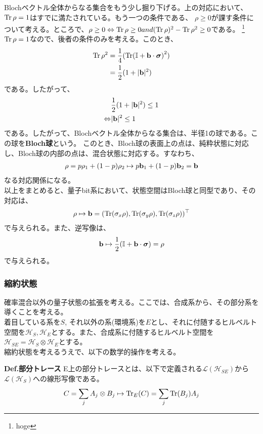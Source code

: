 \documentclass[a4paper,11pt]{jsarticle}
\numberwithin{equation}{section}
\begin{document}
Blochベクトル全体からなる集合をもう少し掘り下げる。上の対応において、$\Tr \rho =1$はすでに満たされている。もう一つの条件である、
$\rho \geq 0$が課す条件について考える。ところで、$\rho\geq 0 \Leftrightarrow \Tr \rho \geq 0 and (\Tr \rho)^2 - \Tr \rho^2 \geq 0$である。
\footnote{hoge}
$\Tr \rho =1$なので、後者の条件のみを考える。このとき、
\begin{align}
    \Tr \rho^2 &= \frac{1}{4}(\Tr(\mathbb{I} + \vb{b}\cdot\bm{\sigma})^2)\\
    &= \frac{1}{2}(1 + |\vb{b}|^2)
\end{align}
である。したがって、
\begin{align}
    &\frac{1}{2}(1 + |\vb{b}|^2) \leq 1\\
    \Leftrightarrow &|\vb{b}|^2 \leq 1
\end{align}
である。したがって、Blochベクトル全体からなる集合は、半径1の球である。この球を\textbf{Bloch球}という。
このとき、Bloch球の表面上の点は、純粋状態に対応し、Bloch球の内部の点は、混合状態に対応する。すなわち、
\begin{align}
    \rho = p\rho_1 + (1-p)\rho_2 \mapsto p\vb{b}_1 + (1-p)\vb{b}_2 = \vb{b}
\end{align}
なる対応関係になる。\\

以上をまとめると、量子bit系において、状態空間はBloch球と同型であり、その対応は、
\begin{align}
    \rho \mapsto \vb{b} = (\Tr(\sigma_x\rho), \Tr(\sigma_y\rho), \Tr(\sigma_z\rho))^{\top}
\end{align}
で与えられる。また、逆写像は、
\begin{align}
    \vb{b} \mapsto \frac{1}{2}(\mathbb{I} + \vb{b}\cdot\bm{\sigma}) = \rho
\end{align}
で与えられる。\\

\subsubsection{縮約状態}
確率混合以外の量子状態の拡張を考える。ここでは、合成系から、その部分系を導くことを考える。\\
着目している系を$S$, それ以外の系(環境系)を$E$とし、それに付随するヒルベルト空間を$\mathcal{H}_S, \mathcal{H}_E$とする。また、合成系に付随するヒルベルト空間を$\mathcal{H}_{SE} = \mathcal{H}_S \otimes \mathcal{H}_E$とする。\\
縮約状態を考えるうえで、以下の数学的操作を考える。
\begin{itembox}[l]{\textbf{Def.部分トレース}}
    E上の部分トレースとは、以下で定義される$\mathcal{L}(\mathcal{H}_{SE})$から$\mathcal{L}(\mathcal{H}_S)$への線形写像である。
    \begin{align}
        C = \sum_{j} A_j \otimes B_j \mapsto \Tr_E(C) = \sum_j \Tr(B_j)A_j
    \end{align}
\end{itembox}
\end{document}
